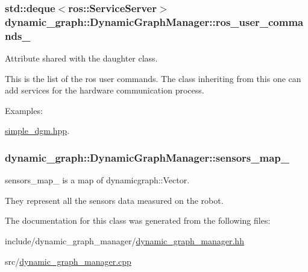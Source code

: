 \subsubsection[{\texorpdfstring{ros\+\_\+user\+\_\+commands\+\_\+}{ros_user_commands_}}]{\setlength{\rightskip}{0pt plus 5cm}std\+::deque$<$ros\+::\+Service\+Server$>$ dynamic\+\_\+graph\+::\+Dynamic\+Graph\+Manager\+::ros\+\_\+user\+\_\+commands\+\_\+\hspace{0.3cm}{\ttfamily [protected]}}\hypertarget{classdynamic__graph_1_1DynamicGraphManager_a0fb35bc44f331db3570c09b75b49cd15}{}\label{classdynamic__graph_1_1DynamicGraphManager_a0fb35bc44f331db3570c09b75b49cd15}


Attribute shared with the daughter class. 

This is the list of the ros user commands. The class inheriting from this one can add services for the hardware communication process. \begin{Desc}
\item[Examples\+: ]\par
\hyperlink{simple_dgm_8hpp-example}{simple\+\_\+dgm.\+hpp}.\end{Desc}
\subsubsection[{\texorpdfstring{sensors\+\_\+map\+\_\+}{sensors_map_}}]{ dynamic\+\_\+graph\+::\+Dynamic\+Graph\+Manager\+::sensors\+\_\+map\+\_\+\hspace{0.3cm}{\ttfamily [protected]}}\hypertarget{classdynamic__graph_1_1DynamicGraphManager_a896bf6cb22d2d88a5a6a307a2e44608e}{}\label{classdynamic__graph_1_1DynamicGraphManager_a896bf6cb22d2d88a5a6a307a2e44608e}


sensors\+\_\+map\+\_\+ is a map of dynamicgraph\+::\+Vector. 

They represent all the sensors data measured on the robot. 

The documentation for this class was generated from the following files\+:\begin{DoxyCompactItemize}
\item 
include/dynamic\+\_\+graph\+\_\+manager/\hyperlink{dynamic__graph__manager_8hh}{dynamic\+\_\+graph\+\_\+manager.\+hh}\item 
src/\hyperlink{dynamic__graph__manager_8cpp}{dynamic\+\_\+graph\+\_\+manager.\+cpp}\end{DoxyCompactItemize}
